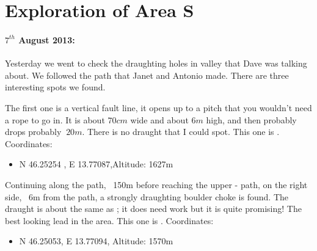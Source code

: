 \section{Exploration of Area S}




\paragraph{$7^{th}$ August 2013: } Yesterday we went to check the draughting holes in  valley that Dave was talking about. We followed the path that Janet and Antonio made. There are three interesting spots we found.

The first one is a vertical fault line, it opens up to a pitch that you wouldn't need a rope to go in. It is about $70cm$ wide and about $6m$ high, and then probably drops probably $~20m$. There is no draught that I could spot.
This one is . Coordinates:

\begin{itemize}
	\item N 46.25254 , E 13.77087,Altitude: 1627m
\end{itemize}


Continuing along the path, ~150m before reaching the upper - path, on the right side, ~6m from the path, a strongly draughting boulder choke is found. The draught is about the same as ; it does need work but it is quite promising! The best looking lead in the area.
This one is . Coordinates:

\begin{itemize}
	\item N 46.25053, E 13.77094, Altitude: 1570m
\end{itemize}

